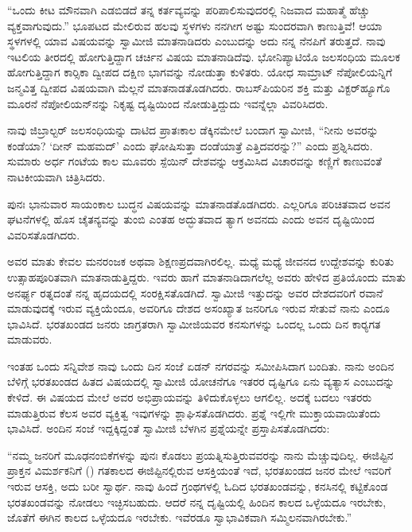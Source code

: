  “ಒಂದು ಕೀಟ ಮೌನವಾಗಿ ಎಡಬಿಡದೆ ತನ್ನ ಕರ್ತವ್ಯವನ್ನು ಪರಿಪಾಲಿಸುವುದರಲ್ಲಿ ನಿಜವಾದ ಮಹಾತ್ಮೆ ಹೆಚ್ಚು ವ್ಯಕ್ತವಾಗುವುದು.” ಭೂಪಟದ ಮೇಲಿರುವ ಹಲವು ಸ್ಥಳಗಳು ನನಗೀಗ ಅಷ್ಟು ಸುಂದರವಾಗಿ ಕಾಣುತ್ತಿವೆ! ಆಯಾ ಸ್ಥಳಗಳಲ್ಲಿ ಯಾವ ವಿಷಯವನ್ನು ಸ್ವಾಮೀಜಿ ಮಾತನಾಡಿದರು ಎಂಬುದನ್ನು ಅದು ನನ್ನ ನೆನಪಿಗೆ ತರುತ್ತದೆ. ನಾವು ಇಟಲಿಯ ತೀರದಲ್ಲಿ ಹೋಗುತ್ತಿದ್ದಾಗ ಚರ್ಚಿನ ವಿಷಯ ಮಾತನಾಡಿದೆವು. ಭೋನಿಪ್ಯಾಟಿಯೊ ಜಲಸಂಧಿಯ ಮೂಲಕ ಹೋಗುತ್ತಿದ್ದಾಗ ಕಾರ‍್ಸಿಕಾ ದ್ವೀಪದ ದಕ್ಷಿಣ ಭಾಗವನ್ನು ನೋಡುತ್ತಾ ಕುಳಿತರು. ಯೋಧ ಸಾಮ್ರಾಟ್ ನೆಪೋಲಿಯನ್ನಿಗೆ ಜನ್ಮವಿತ್ತ ದ್ವೀಪದ ವಿಷಯವಾಗಿ ಮೆಲ್ಲನೆ ಮಾತನಾಡತೊಡಗಿದರು. ರಾಬಸ್‌ಪಿಯರಿನ ಶಕ್ತಿ ಮತ್ತು ವಿಕ್ಟರ್‌ಹ್ಯೂಗೊ ಮೂರನೆ ನೆಪೋಲಿಯನ್‌ನನ್ನು ನಿಕೃಷ್ಟ ದೃಷ್ಟಿಯಿಂದ ನೋಡುತ್ತಿದ್ದುದು ಇವನ್ನೆಲ್ಲಾ ವಿವರಿಸಿದರು. 

 ನಾವು ಜಿಬ್ರಾಲ್ಟರ್ ಜಲಸಂಧಿಯನ್ನು ದಾಟಿದ ಪ್ರಾತಃಕಾಲ ಡೆಕ್ಕಿನಮೇಲೆ ಬಂದಾಗ ಸ್ವಾಮೀಜಿ, “ನೀನು ಅವರನ್ನು ಕಂಡೆಯಾ? ‘ದೀನ್ ಮಹಮದ್’ ಎಂದು ಘೋಷಿಸುತ್ತಾ ದಂಡೆಯಾತ್ರೆ ಎತ್ತಿದವರನ್ನು?” ಎಂದು ಪ್ರಶ್ನಿಸಿದರು. ಸುಮಾರು ಅರ್ಧ ಗಂಟೆಯ ಕಾಲ ಮೂವರು ಸ್ಪೆಯಿನ್ ದೇಶವನ್ನು ಆಕ್ರಮಿಸಿದ ವಿಚಾರವನ್ನು ಕಣ್ಣಿಗೆ ಕಾಣುವಂತೆ ನಾಟಕೀಯವಾಗಿ ಚಿತ್ರಿಸಿದರು. 

 ಪುನಃ ಭಾನುವಾರ ಸಾಯಂಕಾಲ ಬುದ್ಧನ ವಿಷಯವನ್ನು ಮಾತನಾಡತೊಡಗಿದರು. ಎಲ್ಲರಿಗೂ ಪರಿಚಿತವಾದ ಅವನ ಘಟನೆಗಳಲ್ಲಿ ಹೊಸ ಚೈತನ್ಯವನ್ನು ತುಂಬಿ ಎಂತಹ ಅದ್ಭುತವಾದ ತ್ಯಾಗ ಅವನದು ಎಂದು ಅವನ ದೃಷ್ಟಿಯಿಂದ ವಿವರಿಸತೊಡಗಿದರು. 

 ಅವರ ಮಾತು ಕೇವಲ ಮನರಂಜಕ ಅಥವಾ ಶಿಕ್ಷಣಪ್ರದವಾಗಿರಲಿಲ್ಲ. ಮಧ್ಯೆ ಮಧ್ಯೆ ಜೀವನದ ಉದ್ದೇಶವನ್ನು ಕುರಿತು ಉತ್ಸಾಹಪೂರಿತವಾಗಿ ಮಾತನಾಡುತ್ತಿದ್ದರು. ಇವರು ಹಾಗೆ ಮಾತನಾಡಿದಾಗಲೆಲ್ಲ ಅವರು ಹೇಳಿದ ಪ್ರತಿಯೊಂದು ಮಾತು ಅನರ್ಘ್ಯ ರತ್ನದಂತೆ ನನ್ನ ಹೃದಯದಲ್ಲಿ ಸಂರಕ್ಷಿಸತೊಡಗಿದೆ. ಸ್ವಾಮೀಜಿ ಇತ್ತುದನ್ನು ಅವರ ದೇಶದವರಿಗೆ ರವಾನೆ ಮಾಡುವುದಕ್ಕೆ ಇರುವ ವ್ಯಕ್ತಿಯೆಂದೂ, ಅವರಿಗೂ ದೇಶದ ಅಸಂಖ್ಯಾತ ಜನರಿಗೂ ಇರುವ ಸೇತುವೆ ನಾನು ಎಂದೂ ಭಾವಿಸಿದೆ. ಭರತಖಂಡದ ಜನರು ಜಾಗ್ರತರಾಗಿ ಸ್ವಾಮೀಜಿಯವರ ಕನಸುಗಳನ್ನು ಒಂದಲ್ಲ ಒಂದು ದಿನ ಕಾರ‍್ಯಗತ ಮಾಡುವರು. 

 ಇಂತಹ ಒಂದು ಸನ್ನಿವೇಶ ನಾವು ಒಂದು ದಿನ ಸಂಜೆ ಏಡನ್ ನಗರವನ್ನು ಸಮೀಪಿಸಿದಾಗ ಬಂದಿತು. ನಾನು ಅಂದಿನ ಬೆಳಿಗ್ಗೆ ಭರತಖಂಡದ ಹಿತದ ವಿಷಯದಲ್ಲಿ ಸ್ವಾಮೀಜಿ ಯೋಚನೆಗೂ ಇತರರ ದೃಷ್ಟಿಗೂ ಏನು ವ್ಯತ್ಯಾಸ ಎಂಬುದನ್ನು ಕೇಳಿದೆ. ಈ ವಿಷಯದ ಮೇಲೆ ಅವರ ಅಭಿಪ್ರಾಯವನ್ನು ತಿಳಿದುಕೊಳ್ಳಲು ಆಗಲಿಲ್ಲ. ಅದಕ್ಕೆ ಬದಲು ಇತರರು ಮಾಡುತ್ತಿರುವ ಕೆಲಸ ಅವರ ವ್ಯಕ್ತಿತ್ವ ಇವುಗಳನ್ನು ಶ್ಲಾಘಿಸತೊಡಗಿದರು. ಪ್ರಶ್ನೆ ಇಲ್ಲಿಗೇ ಮುಕ್ತಾಯವಾಯಿತೆಂದು ಭಾವಿಸಿದೆ. ಅಂದಿನ ಸಂಜೆ ಇದ್ದಕ್ಕಿದ್ದಂತೆ ಸ್ವಾಮೀಜಿ ಬೆಳಗಿನ ಪ್ರಶ್ನೆಯನ್ನೇ ಪ್ರಸ್ತಾಪಿಸತೊಡಗಿದರು: 

 “ನಮ್ಮ ಜನರಿಗೆ ಮೂಢನಂಬಿಕೆಗಳನ್ನು ಪುನಃ ಕೊಡಲು ಪ್ರಯತ್ನಿಸುತ್ತಿರುವವರನ್ನು ನಾನು ಮೆಚ್ಚುವುದಿಲ್ಲ. ಈಜಿಪ್ಟಿನ ಪ್ರಾಕ್ತನ ವಿಮರ್ಶಕನಿಗೆ () ಗತಕಾಲದ ಈಜಿಪ್ಟಿನಲ್ಲಿರುವ ಆಸಕ್ತಿಯಂತೆ ಇದೆ, ಭರತಖಂಡದ ಜನರ ಮೇಲೆ ಇವರಿಗೆ ಇರುವ ಆಸಕ್ತಿ, ಅದು ಬರೀ ಸ್ವಾರ್ಥ. ನಾವು ಹಿಂದೆ ಗ್ರಂಥಗಳಲ್ಲಿ ಓದಿದ ಭರತಖಂಡವನ್ನು, ಕನಸಿನಲ್ಲಿ ಕಟ್ಟಿಕೊಂಡ ಭರತಖಂಡವನ್ನು ನೋಡಲು ಇಚ್ಛಿಸಬಹುದು. ಆದರೆ ನನ್ನ ದೃಷ್ಟಿಯಲ್ಲಿ ಹಿಂದಿನ ಕಾಲದ ಒಳ್ಳೆಯದೂ ಇರಬೇಕು, ಜೊತೆಗೆ ಈಗಿನ ಕಾಲದ ಒಳ್ಳೆಯದೂ ಇರಬೇಕು. ಇವೆರಡೂ ಸ್ವಾಭಾವಿಕವಾಗಿ ಸಮ್ಮಿಲನವಾಗಿರಬೇಕು.” 

